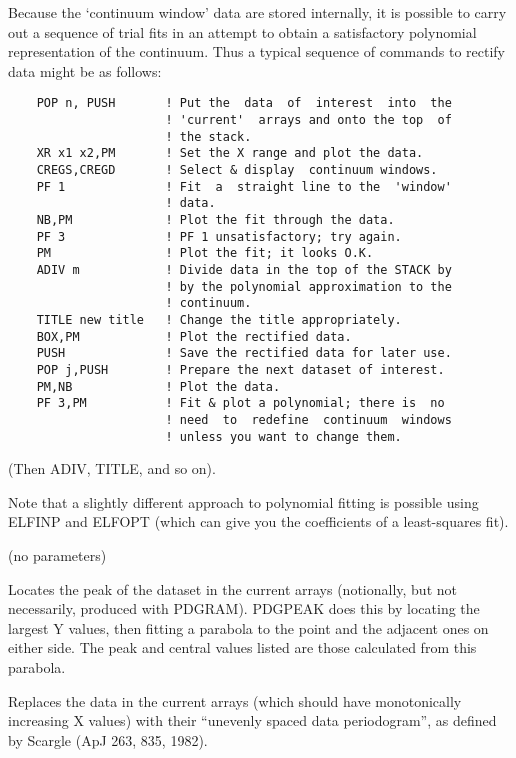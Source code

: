 \begin {description}
Because the `continuum window' data are stored internally, it is
possible to carry out a sequence of trial fits in an attempt to obtain
a satisfactory polynomial representation of the continuum. Thus a
typical sequence of commands to rectify data might be as follows:

\begin{verbatim}
    POP n, PUSH       ! Put the  data  of  interest  into  the
                      ! 'current'  arrays and onto the top  of
                      ! the stack.
    XR x1 x2,PM       ! Set the X range and plot the data.
    CREGS,CREGD       ! Select & display  continuum windows.
    PF 1              ! Fit  a  straight line to the  'window'
                      ! data.
    NB,PM             ! Plot the fit through the data.
    PF 3              ! PF 1 unsatisfactory; try again.
    PM                ! Plot the fit; it looks O.K.
    ADIV m            ! Divide data in the top of the STACK by
                      ! by the polynomial approximation to the
                      ! continuum.
    TITLE new title   ! Change the title appropriately.
    BOX,PM            ! Plot the rectified data.
    PUSH              ! Save the rectified data for later use.
    POP j,PUSH        ! Prepare the next dataset of interest.
    PM,NB             ! Plot the data.
    PF 3,PM           ! Fit & plot a polynomial; there is  no
                      ! need  to  redefine  continuum  windows
                      ! unless you want to change them.
\end{verbatim}

(Then ADIV, TITLE, and so on).

Note that a slightly different approach to polynomial fitting is
possible using ELFINP and ELFOPT (which can give you the coefficients
of a least-squares fit).

\item [PDGPEAK] (no parameters)

Locates the peak of the dataset in the current arrays (notionally, but
not necessarily, produced with PDGRAM). PDGPEAK does this by locating
the largest Y values, then fitting a parabola to the point and the
adjacent ones on either side. The peak and central values listed are
those calculated from this parabola.

\item [PDGRAM] [fl fh df p]

Replaces the data in the current arrays (which should have
monotonically increasing X values) with their ``unevenly spaced data
periodogram'', as defined by Scargle (ApJ 263, 835, 1982).


\end{description}

